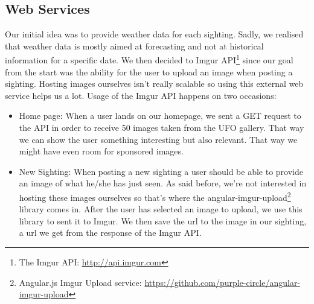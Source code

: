 \documentclass{article}
\begin{document}
\subsection{Web Services}
Our initial idea was to provide weather data for each sighting. Sadly, we realised that weather data is mostly aimed at forecasting and not at historical information for a specific date. We then decided to Imgur API\footnote{The Imgur API: \url{http://api.imgur.com}} since our goal from the start was the ability for the user to upload an image when posting a sighting.  Hosting images ourselves isn't really scalable so using this external web service helps us a lot.
Usage of the Imgur API happens on two occasions:
\begin{itemize}
\item Home page: When a user lands on our homepage, we sent a GET request to the API in order to receive 50 images taken from the UFO gallery. That way we can show the user something interesting but also relevant. That way we might have even room for sponsored images.
\item New Sighting: When posting a new sighting a user should be able to provide an image of what he/she has just seen. As said before, we're not interested in hosting these images ourselves so that's where the angular-imgur-upload\footnote{Angular.js Imgur Upload service: \url{https://github.com/purple-circle/angular-imgur-upload}} library comes in. After the user has selected an image to upload, we use this library to sent it to Imgur. We then save the url to the image in our sighting, a url we get from the response of the Imgur API.
\end{itemize}
\end{document}
